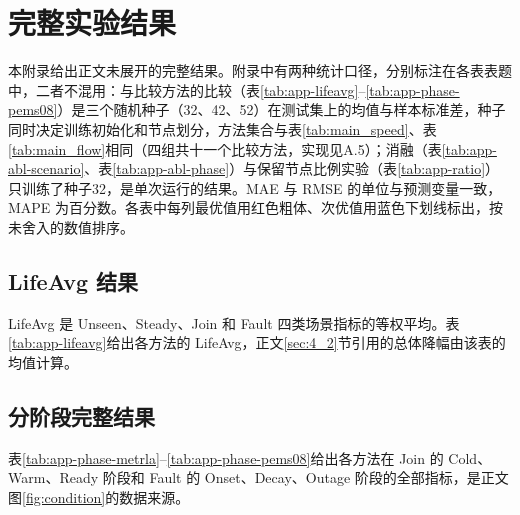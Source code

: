\section{完整实验结果}\label{app:A}
本附录给出正文未展开的完整结果。附录中有两种统计口径，分别标注在各表表题中，二者不混用：与比较方法的比较（表\ref{tab:app-lifeavg}--\ref{tab:app-phase-pems08}）是三个随机种子（32、42、52）在测试集上的均值与样本标准差，种子同时决定训练初始化和节点划分，方法集合与表\ref{tab:main_speed}、表\ref{tab:main_flow}相同（四组共十一个比较方法，实现见A.5）；消融（表\ref{tab:app-abl-scenario}、表\ref{tab:app-abl-phase}）与保留节点比例实验（表\ref{tab:app-ratio}）只训练了种子32，是单次运行的结果。MAE 与 RMSE 的单位与预测变量一致，MAPE 为百分数。各表中每列最优值用红色粗体、次优值用蓝色下划线标出，按未舍入的数值排序。

\subsection{LifeAvg 结果}\label{sec:A_1}

LifeAvg 是 Unseen、Steady、Join 和 Fault 四类场景指标的等权平均。表\ref{tab:app-lifeavg}给出各方法的 LifeAvg，正文\ref{sec:4_2}节引用的总体降幅由该表的均值计算。

\begin{table}[p]
\centering
\caption{\textbf{四个数据集上的 LifeAvg 结果。}测试集，种子32、42、52的均值±样本标准差（种子同时决定节点划分）。}
\label{tab:app-lifeavg}
\small
\resizebox{\linewidth}{!}{}
\end{table}

\subsection{分阶段完整结果}\label{sec:A_2}

表\ref{tab:app-phase-metrla}--\ref{tab:app-phase-pems08}给出各方法在 Join 的 Cold、Warm、Ready 阶段和 Fault 的 Onset、Decay、Outage 阶段的全部指标，是正文图\ref{fig:condition}的数据来源。

\begin{table}[p]
\centering
\caption{\textbf{METR-LA 的分阶段结果。}测试集，种子32、42、52的均值±样本标准差。上半部分为 Join 的三个阶段，下半部分为 Fault 的三个阶段。}
\label{tab:app-phase-metrla}
\small
\resizebox{\linewidth}{!}{}
\end{table}

